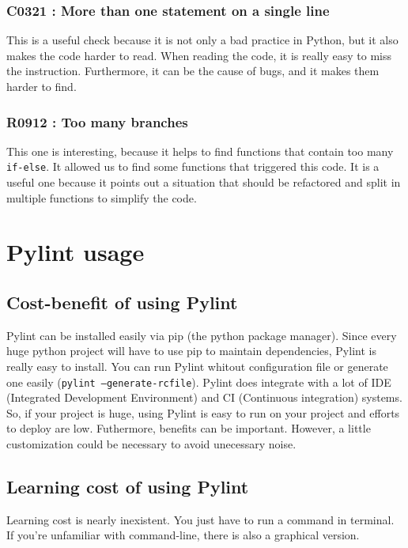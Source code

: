 \documentclass[12pt, a4paper]{article}
\newcommand{\pyl}{\textsf{Pylint}}
\begin{document}
\subsubsection*{C0321 : More than one statement on a single line}
This is a useful check because it is not only a bad practice in Python, but it also makes the code harder to read.
When reading the code, it is really easy to miss the instruction.
Furthermore, it can be the cause of bugs, and it makes them harder to find.


\subsubsection*{R0912 : Too many branches}
This one is interesting, because it helps to find functions that contain too many \lstinline|if-else|.
It allowed us to find some functions that triggered this code.
It is a useful one because it points out a situation that should be refactored and split in multiple functions to simplify the code.


\newpage
\section*{\pyl{} usage}
\subsection*{Cost-benefit of using \pyl{}}

\pyl{} can be installed easily via pip (the python package manager).
Since every huge python project will have to use pip to maintain dependencies, \pyl{} is really easy to install.
You can run \pyl{} whitout configuration file or generate one easily (\texttt{pylint --generate-rcfile}).
\pyl{} does integrate with a lot of IDE (Integrated Development Environment) and CI (Continuous integration) systems.
So, if your project is huge, using \pyl{} is easy to run on your project and efforts to deploy are low.
Futhermore, benefits can be important.
However, a little customization could be necessary to avoid unecessary noise.


\subsection*{Learning cost of using \pyl{}}

Learning cost is nearly inexistent. 
You just have to run a command in terminal.
If you're unfamiliar with command-line, there is also a graphical version.
\end{document}
